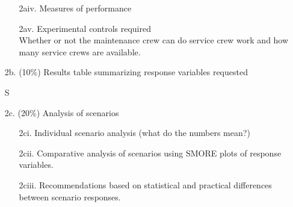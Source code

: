 \documentclass[answers]{exam}
\begin{document}
\begin{questions}
\begin{enumerate}
\begin{solution}
\begin{enumerate}
			\item[2aiv.] Measures of performance \\
				
			\item[2av.] Experimental controls required \\
				Whether or not the maintenance crew can do service crew work 
				and how many service crews are available.
		\end{enumerate}
	\end{solution}
	\item[2b.] (10\%) Results table summarizing response variables requested
	\begin{solution}
		S
	\end{solution}
	\item[2c.] (20\%) Analysis of scenarios
	\begin{solution}
	\begin{enumerate}
		\item[2ci.] Individual scenario analysis (what do the numbers mean?)\\
		\item[2cii.] Comparative analysis of scenarios using SMORE plots of response variables.\\
		\item[2ciii.] Recommendations based on statistical and practical differences between scenario responses. \\
	\end{enumerate}	
	\end{solution}
\end{enumerate}


\end{questions}
\end{document}
